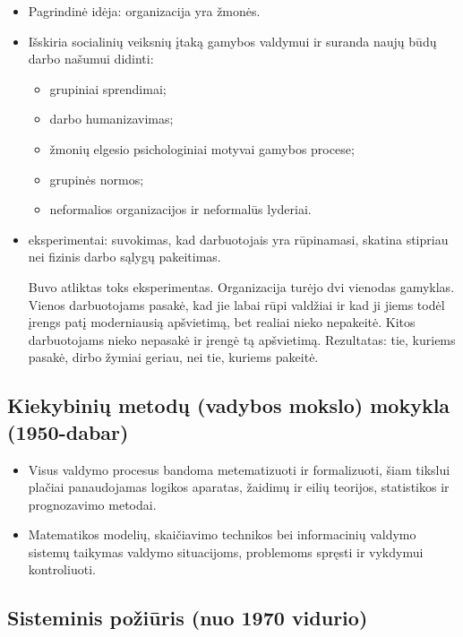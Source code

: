 \begin{itemize}
  \item Pagrindinė idėja: organizacija yra žmonės.
  \item Išskiria socialinių veiksnių įtaką gamybos valdymui ir suranda
    naujų būdų darbo našumui didinti:
    \begin{itemize}
      \item grupiniai sprendimai;
      \item darbo humanizavimas;
      \item žmonių elgesio psichologiniai motyvai gamybos procese;
      \item grupinės normos;
      \item neformalios organizacijos ir neformalūs lyderiai.
    \end{itemize}
  \item {} eksperimentai: suvokimas, kad
    darbuotojais yra rūpinamasi, skatina stipriau nei fizinis darbo
    sąlygų pakeitimas.

    \begin{note}
      Buvo atliktas toks eksperimentas. Organizacija turėjo dvi vienodas
      gamyklas. Vienos darbuotojams pasakė, kad jie labai rūpi valdžiai
      ir kad ji jiems todėl įrengs patį moderniausią apšvietimą, bet
      realiai nieko nepakeitė. Kitos darbuotojams nieko nepasakė ir
      įrengė tą apšvietimą. Rezultatas: tie, kuriems pasakė, dirbo
      žymiai geriau, nei tie, kuriems pakeitė.
    \end{note}
\end{itemize}

\subsection{Kiekybinių metodų (vadybos mokslo) mokykla (1950-dabar)}

\begin{itemize}
  \item Visus valdymo procesus bandoma metematizuoti ir formalizuoti,
    šiam tikslui plačiai panaudojamas logikos aparatas, žaidimų
    ir eilių teorijos, statistikos ir prognozavimo metodai.
  \item Matematikos modelių, skaičiavimo technikos bei informacinių
    valdymo sistemų taikymas valdymo situacijoms, problemoms spręsti
    ir vykdymui kontroliuoti.
\end{itemize}

\subsection{Sisteminis požiūris (nuo 1970 vidurio)}

